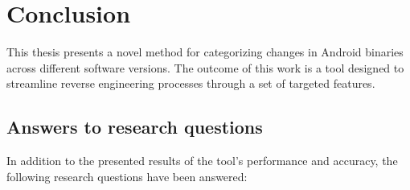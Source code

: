 
\chapter{Conclusion}
\label{cha:conclusion}

This thesis presents a novel method for categorizing changes in Android binaries across different software versions. The outcome of this work is a tool designed to streamline reverse engineering processes through a set of targeted features.



\section{Answers to research questions}
In addition to the presented results of the tool's performance and accuracy, the following research questions have been answered:

